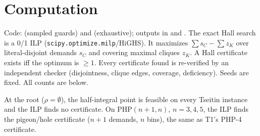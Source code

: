 \documentclass[11pt]{article}
\theoremstyle{definition}
\theoremstyle{remark}
\begin{document}
\section{Computation}\label{sec:comp}
Code:  (sampled guards) and
 (exhaustive); outputs in  and . The exact Hall search is a
0/1 ILP (\texttt{scipy.optimize.milp}/HiGHS). It maximizes $\sum s_C-\sum z_K$ over
literal-disjoint demands $s_C$ and covering maximal cliques $z_K$. A Hall certificate exists iff
the optimum is $\ge1$. Every certificate found is re-verified by an independent checker
(disjointness, clique edges, coverage, deficiency). Seeds are fixed. All counts are below.

\begin{center}\small
{}
\end{center}
At the root ($\rho=\emptyset$), the half-integral point is feasible on every Tseitin instance and
the ILP finds no certificate. On PHP$(n{+}1,n)$, $n=3,4,5$, the ILP finds the pigeon/hole
certificate ($n{+}1$ demands, $n$ bins), the same as T1's PHP-4 certificate.
\end{document}

